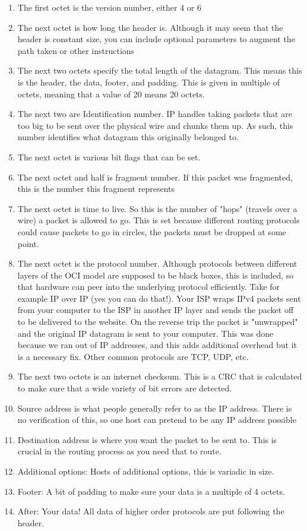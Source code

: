 \begin{enumerate}
  \item The first octet is the version number, either 4 or 6
  \item The next octet is how long the header is.
    Although it may seem that the header is constant size, you can include optional parameters to augment the path taken or other instructions
  \item The next two octets specify the total length of the datagram.
    This means this is the header, the data, footer, and padding.
    This is given in multiple of octets, meaning that a value of 20 means 20 octets.
  \item The next two are Identification number.
    IP handles taking packets that are too big to be sent over the physical wire and chunks them up.
    As such, this number identifies what datagram this originally belonged to.
  \item The next octet is various bit flags that can be set.
  \item The next octet and half is fragment number.
    If this packet was fragmented, this is the number this fragment represents
  \item The next octet is time to live.
    So this is the number of "hops" (travels over a wire) a packet is allowed to go.
    This is set because different routing protocols could cause packets to go in circles, the packets must be dropped at some point.
  \item The next octet is the protocol number.
    Although protocols between different layers of the OCI model are supposed to be black boxes, this is included, so that hardware can peer into the underlying protocol efficiently.
    Take for example IP over IP (yes you can do that!).
    Your ISP wraps IPv4 packets sent from your computer to the ISP in another IP layer and sends the packet off to be delivered to the website.
    On the reverse trip the packet is "unwrapped" and the original IP datagram is sent to your computer.
    This was done because we ran out of IP addresses, and this adds additional overhead but it is a necessary fix.
    Other common protocols are TCP, UDP, etc.
  \item The next two octets is an internet checksum.
    This is a CRC that is calculated to make sure that a wide variety of bit errors are detected.
  \item Source address is what people generally refer to as the IP address.
    There is no verification of this, so one host can pretend to be any IP address possible
  \item Destination address is where you want the packet to be sent to.
    This is crucial in the routing process as you need that to route.
  \item Additional options: Hosts of additional options, this is variadic in size.
  \item Footer: A bit of padding to make sure your data is a multiple of 4 octets.
  \item After: Your data! All data of higher order protocols are put following the header.
\end{enumerate}

